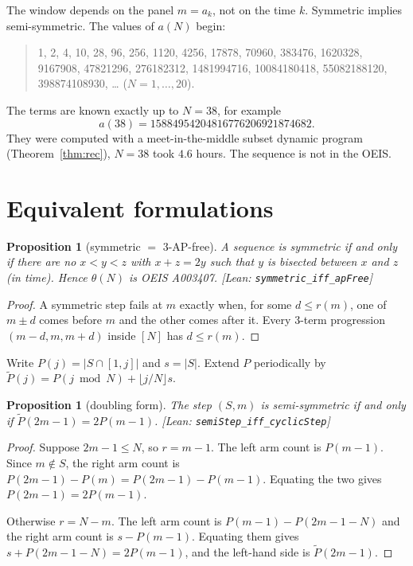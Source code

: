 \documentclass[11pt]{article}
\newtheorem{proposition}[theorem]{Proposition}
\theoremstyle{definition}
\theoremstyle{remark}
\newcommand{\lean}[1]{\textsf{\small[Lean: \texttt{#1}]}}
\begin{document}
The window depends on the panel $m=a_k$, not on the time $k$. Symmetric implies
semi-symmetric. The values of $a(N)$ begin:

\begin{quote}\small
1, 2, 4, 10, 28, 96, 256, 1120, 4256, 17878, 70960, 383476, 1620328, 9167908,
47821296, 276182312, 1481994716, 10084180418, 55082188120, 398874108930, \dots
\quad($N=1,\dots,20$).
\end{quote}

The terms are known exactly up to $N=38$, for example
\[a(38)=15884954204816776206921874682.\]
They were computed with a meet-in-the-middle
subset dynamic program (Theorem~\ref{thm:rec}), $N=38$ took $4.6$ hours. The sequence
is not in the OEIS.

\section{Equivalent formulations}

\begin{proposition}[symmetric $=$ 3-AP-free]\label{prop:ap}
A sequence is symmetric if and only if there are no $x<y<z$ with $x+z=2y$ such that
$y$ is bisected between $x$ and $z$ (in time). Hence $\theta(N)$ is OEIS A003407.
\lean{symmetric\_iff\_apFree}
\end{proposition}

\begin{proof}
A symmetric step fails at $m$ exactly when, for some $d\le r(m)$, one of $m\pm d$ comes
before $m$ and the other comes after it. Every 3-term progression $(m-d,m,m+d)$ inside
$[N]$ has $d\le r(m)$.
\end{proof}

Write $P(j)=|S\cap[1,j]|$ and $s=|S|$. Extend $P$ periodically by
$\tilde P(j)=P(j\bmod N)+\lfloor j/N\rfloor s$.

\begin{proposition}[doubling form]\label{prop:dbl}
The step $(S,m)$ is semi-symmetric if and only if $\tilde P(2m-1) = 2P(m-1)$.
\lean{semiStep\_iff\_cyclicStep}
\end{proposition}

\begin{proof}
Suppose $2m-1\le N$, so $r=m-1$. The left arm count is $P(m-1)$. Since $m\notin S$,
the right arm count is $P(2m-1)-P(m)=P(2m-1)-P(m-1)$. Equating the two gives
$P(2m-1)=2P(m-1)$.

Otherwise $r=N-m$. The left arm count is $P(m-1)-P(2m-1-N)$ and the right arm count is
$s-P(m-1)$. Equating them gives $s+P(2m-1-N)=2P(m-1)$, and the left-hand side is
$\tilde P(2m-1)$.
\end{proof}
\end{document}
